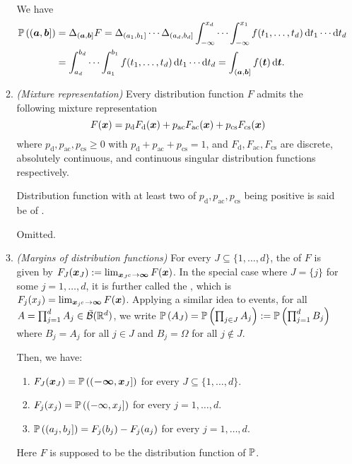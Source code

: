 \begin{enumerate}
\begin{enumerate}
\begin{pf}
We have
\begin{align*}
\prob{(\vect{a},\vect{b}]}
&=\Delta_{(\vect{a},\vect{b}]}F
=\Delta_{(a_1,b_1]}\cdots\Delta_{(a_d,b_d]}
\int_{-\infty}^{x_d}\dotsb\int_{-\infty}^{x_1}f(t_1,\dotsc,t_d)\odif{t_1}\cdots\odif{t_d} \\
&=\int_{a_d}^{b_d}\dotsb\int_{a_1}^{b_1}f(t_1,\dotsc,t_d)\odif{t_1}\cdots\odif{t_d}
=\int_{(\vect{a},\vect{b}]}^{}f(\vect{t})\odif{\vect{t}}.
\end{align*}
\end{pf}
\item \emph{(Mixture representation)} Every distribution function \(F\) admits
the following mixture representation
\[
F(\bm{x})=p_{\mathrm{d}}F_{\mathrm{d}}(\bm{x})+
p_{\mathrm{ac}}F_{\mathrm{ac}}(\bm{x})+
p_{\mathrm{cs}}F_{\mathrm{cs}}(\bm{x})
\]
where \(p_{\mathrm{d}},p_{\mathrm{ac}},p_{\mathrm{cs}}\ge 0\) with
\(p_{\mathrm{d}}+p_{\mathrm{ac}}+p_{\mathrm{cs}}=1\), and
\(F_{\mathrm{d}},F_{\mathrm{ac}},F_{\mathrm{cs}}\) are discrete, absolutely
continuous, and continuous singular distribution functions respectively.
\begin{note}
Distribution function with at least two of
\(p_{\mathrm{d}},p_{\mathrm{ac}},p_{\mathrm{cs}}\) being positive is said be of
.
\end{note}

\begin{pf}
Omitted.
\end{pf}
\item \emph{(Margins of distribution functions)} For every \(J\subseteq
\{1,\dotsc,d\}\), the  of \(F\) is given by
\(F_J(\bm{x}_J):=\lim_{\bm{x}_{J^c}\to\bm{\infty}}F(\bm{x})\).  In the
special case where \(J=\{j\}\) for some \(j=1,\dotsc,d\), it is further called
the , which is
\(F_j(x_j)=\lim_{\bm{x}_{j^c}\to\bm{\infty}}F(\bm{x})\). Applying a similar
idea to events, for all \(A=\prod_{j=1}^{d}A_j\in\bar{\mathcal{B}}(\mathbb{R}^d)\), we
write \(\mathbb{P}\left(A_J\right)=\mathbb{P}\left(\prod_{j\in J}A_j\right):=\mathbb{P}\left(\prod_{j=1}^{d}B_j\right)\)
where \(B_j=A_j\) for all \(j\in J\) and \(B_j=\Omega\) for all \(j\notin J\).

Then, we have:
\begin{enumerate}
\item \(F_J(\bm{x}_J)=\mathbb{P}\left((\bm{-\infty},\bm{x}_{J}]\right)\) for every
\(J\subseteq \{1,\dotsc,d\}\).
\item \(F_j(x_j)=\mathbb{P}\left((-\infty,x_{j}]\right)\) for every \(j=1,\dotsc,d\).
\item \(\mathbb{P}\left((a_j,b_j]\right)=F_{j}(b_j)-F_{j}(a_j)\) for every \(j=1,\dotsc,d\).
\end{enumerate}
Here \(F\) is supposed to be the distribution function of \(\mathbb{P}\).


\end{enumerate}
\end{enumerate}
